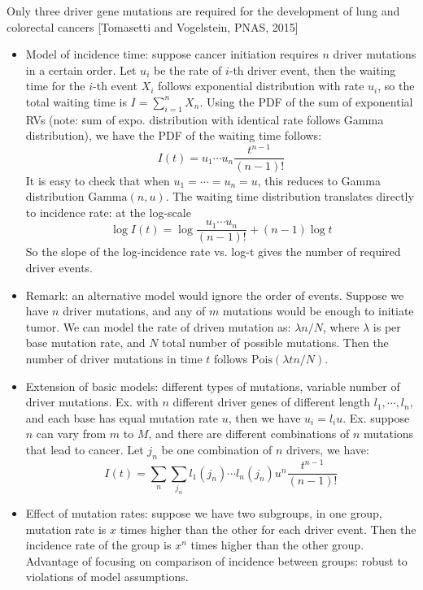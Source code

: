 \documentclass{report}
\begin{document}
Only three driver gene mutations are required for the development of lung and colorectal cancers [Tomasetti and Vogelstein, PNAS, 2015]
\begin{itemize}
	\item Model of incidence time: suppose cancer initiation requires $n$ driver mutations in a certain order. Let $u_i$ be the rate of $i$-th driver event, then the waiting time for the $i$-th event $X_i$ follows exponential distribution with rate $u_i$, so the total waiting time is $I = \sum_{i=1}^n X_n$. Using the PDF of the sum of exponential RVs (note: sum of expo. distribution with identical rate follows Gamma distribution), we have the PDF of the waiting time follows:
	\begin{equation}
	I(t) = u_1 \cdots u_n \frac{t^{n-1}}{(n-1)!}
	\end{equation}
	It is easy to check that when $u_1 = \cdots = u_n = u$, this reduces to Gamma distribution $\text{Gamma}(n, u)$. The waiting time distribution translates directly to incidence rate: at the log-scale
	\begin{equation}
	\log I(t) = \log \frac{u_1 \cdots u_n}{(n-1)!} + (n-1) \log t 
	\end{equation}
	So the slope of the log-incidence rate vs. log-t gives the number of required driver events. 
	
	\item Remark: an alternative model would ignore the order of events. Suppose we have $n$ driver mutations, and any of $m$ mutations would be enough to initiate tumor. We can model the rate of driven mutation as: $\lambda n / N$, where $\lambda$ is per base mutation rate, and $N$ total number of possible mutations. Then the number of driver mutations in time $t$ follows $\text{Pois}(\lambda t n/N)$.
		
	\item Extension of basic models: different types of mutations, variable number of driver mutations. Ex. with $n$ different driver genes of different length $l_1, \cdots, l_n$, and each base has equal mutation rate $u$, then we have $u_i = l_i u$. Ex. suppose $n$ can vary from $m$ to $M$, and there are different combinations of $n$ mutations that lead to cancer. Let $j_n$ be one combination of $n$ drivers, we have:
	\begin{equation}
	I(t) = \sum_n \sum_{j_n} l_1(j_n) \cdots l_n(j_n) u^n \frac{t^{n-1}}{(n-1)!}
	\end{equation} 
	
	\item Effect of mutation rates: suppose we have two subgroups, in one group, mutation rate is $x$ times higher than the other for each driver event. Then the incidence rate of the group is $x^n$ times higher than the other group. Advantage of focusing on comparison of incidence between groups: robust to violations of model assumptions. 
	

\end{itemize}
\end{document}

